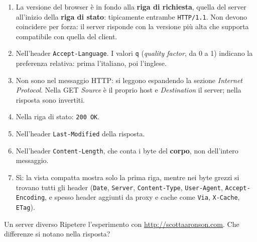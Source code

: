 \begin{enumerate}[label=(\alph*)]
    \item La versione del browser è in fondo alla \textbf{riga di richiesta}, quella del server all'inizio della \textbf{riga di
          stato}: tipicamente entrambe \texttt{HTTP/1.1}. Non devono coincidere per forza: il server risponde con la versione più
          alta che supporta compatibile con quella del client.
    \item Nell'header \texttt{Accept-Language}. I valori \texttt{q} (\emph{quality factor}, da 0 a 1) indicano la preferenza
          relativa: prima l'italiano, poi l'inglese.
    \item Non sono nel messaggio HTTP: si leggono espandendo la sezione \emph{Internet Protocol}. Nella GET \emph{Source} è il
          proprio host e \emph{Destination} il server; nella risposta sono invertiti.
    \item Nella riga di stato: \texttt{200 OK}.
    \item Nell'header \texttt{Last-Modified} della risposta.
    \item Nell'header \texttt{Content-Length}, che conta i byte del \textbf{corpo}, non dell'intero messaggio.
    \item Sì: la vista compatta mostra solo la prima riga, mentre nei byte grezzi si trovano tutti gli header (\texttt{Date},
          \texttt{Server}, \texttt{Content-Type}, \texttt{User-Agent}, \texttt{Accept-Encoding}, e spesso header aggiunti da proxy
          e cache come \texttt{Via}, \texttt{X-Cache}, \texttt{ETag}).
\end{enumerate}


\begin{esercizio}{Un server diverso}
Ripetere l'esperimento con \url{http://scottaaronson.com}. Che differenze si notano nella risposta?
\end{esercizio}

